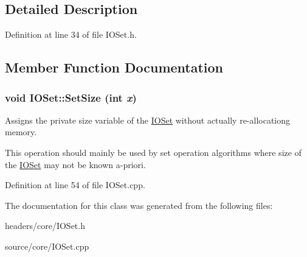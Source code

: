 \subsection{Detailed Description}


Definition at line 34 of file IOSet.h.



\subsection{Member Function Documentation}
\hypertarget{class_i_o_set_a45a883dcdfae7eafbc303039727bdf49}{
\subsubsection[{SetSize}]{\setlength{\rightskip}{0pt plus 5cm}void IOSet::SetSize (int {\em x})}}
\label{class_i_o_set_a45a883dcdfae7eafbc303039727bdf49}


Assigns the private size variable of the \hyperlink{class_i_o_set}{IOSet} without actually re-\/allocationg memory. 

This operation should mainly be used by set operation algorithms where size of the \hyperlink{class_i_o_set}{IOSet} may not be known a-\/priori. 

Definition at line 54 of file IOSet.cpp.



The documentation for this class was generated from the following files:\begin{DoxyCompactItemize}
\item 
headers/core/IOSet.h\item 
source/core/IOSet.cpp\end{DoxyCompactItemize}
